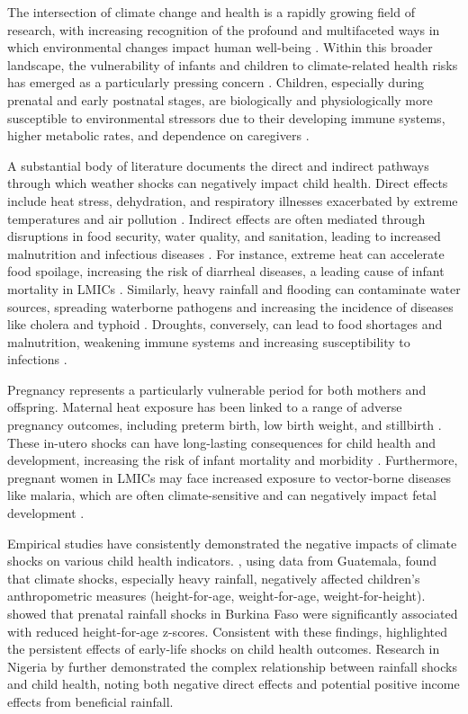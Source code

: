 \documentclass[12pt]{article}
\begin{document}
The intersection of climate change and health is a rapidly growing field of research, with increasing recognition of the profound and multifaceted ways in which environmental changes impact human well-being \cite{costello2009, ebi2018}.  Within this broader landscape, the vulnerability of infants and children to climate-related health risks has emerged as a particularly pressing concern \cite{who_climate_change_children}.  Children, especially during prenatal and early postnatal stages, are biologically and physiologically more susceptible to environmental stressors due to their developing immune systems, higher metabolic rates, and dependence on caregivers \cite{bradman2012}.

A substantial body of literature documents the direct and indirect pathways through which weather shocks can negatively impact child health.  Direct effects include heat stress, dehydration, and respiratory illnesses exacerbated by extreme temperatures and air pollution \cite{kuehn2017}. Indirect effects are often mediated through disruptions in food security, water quality, and sanitation, leading to increased malnutrition and infectious diseases \cite{caruso2024, grace2012}.  For instance, extreme heat can accelerate food spoilage, increasing the risk of diarrheal diseases, a leading cause of infant mortality in LMICs \cite{who_diarrhoeal_disease}.  Similarly, heavy rainfall and flooding can contaminate water sources, spreading waterborne pathogens and increasing the incidence of diseases like cholera and typhoid \cite{rose2001}. Droughts, conversely, can lead to food shortages and malnutrition, weakening immune systems and increasing susceptibility to infections \cite{dimitrova2020, nguyen2022}.

Pregnancy represents a particularly vulnerable period for both mothers and offspring.  Maternal heat exposure has been linked to a range of adverse pregnancy outcomes, including preterm birth, low birth weight, and stillbirth \cite{strand2012, sun2020}.  These in-utero shocks can have long-lasting consequences for child health and development, increasing the risk of infant mortality and morbidity \cite{black2013}.  Furthermore, pregnant women in LMICs may face increased exposure to vector-borne diseases like malaria, which are often climate-sensitive and can negatively impact fetal development \cite{tusting2013}.

Empirical studies have consistently demonstrated the negative impacts of climate shocks on various child health indicators.  \cite{portner2010}, using data from Guatemala, found that climate shocks, especially heavy rainfall, negatively affected children's anthropometric measures (height-for-age, weight-for-age, weight-for-height).  \cite{borjean2012} showed that prenatal rainfall shocks in Burkina Faso were significantly associated with reduced height-for-age z-scores.  Consistent with these findings, \cite{akresh2012} highlighted the persistent effects of early-life shocks on child health outcomes.  Research in Nigeria by \cite{rabassa2014} further demonstrated the complex relationship between rainfall shocks and child health, noting both negative direct effects and potential positive income effects from beneficial rainfall.
\end{document}
